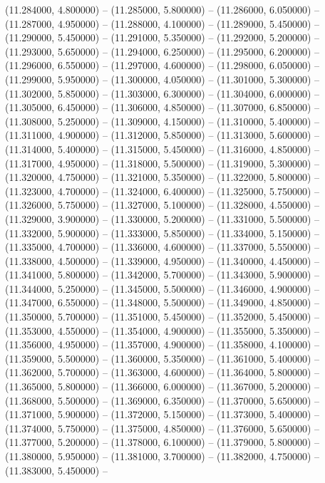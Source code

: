 (11.284000, 4.800000) -- 
(11.285000, 5.800000) -- 
(11.286000, 6.050000) -- 
(11.287000, 4.950000) -- 
(11.288000, 4.100000) -- 
(11.289000, 5.450000) -- 
(11.290000, 5.450000) -- 
(11.291000, 5.350000) -- 
(11.292000, 5.200000) -- 
(11.293000, 5.650000) -- 
(11.294000, 6.250000) -- 
(11.295000, 6.200000) -- 
(11.296000, 6.550000) -- 
(11.297000, 4.600000) -- 
(11.298000, 6.050000) -- 
(11.299000, 5.950000) -- 
(11.300000, 4.050000) -- 
(11.301000, 5.300000) -- 
(11.302000, 5.850000) -- 
(11.303000, 6.300000) -- 
(11.304000, 6.000000) -- 
(11.305000, 6.450000) -- 
(11.306000, 4.850000) -- 
(11.307000, 6.850000) -- 
(11.308000, 5.250000) -- 
(11.309000, 4.150000) -- 
(11.310000, 5.400000) -- 
(11.311000, 4.900000) -- 
(11.312000, 5.850000) -- 
(11.313000, 5.600000) -- 
(11.314000, 5.400000) -- 
(11.315000, 5.450000) -- 
(11.316000, 4.850000) -- 
(11.317000, 4.950000) -- 
(11.318000, 5.500000) -- 
(11.319000, 5.300000) -- 
(11.320000, 4.750000) -- 
(11.321000, 5.350000) -- 
(11.322000, 5.800000) -- 
(11.323000, 4.700000) -- 
(11.324000, 6.400000) -- 
(11.325000, 5.750000) -- 
(11.326000, 5.750000) -- 
(11.327000, 5.100000) -- 
(11.328000, 4.550000) -- 
(11.329000, 3.900000) -- 
(11.330000, 5.200000) -- 
(11.331000, 5.500000) -- 
(11.332000, 5.900000) -- 
(11.333000, 5.850000) -- 
(11.334000, 5.150000) -- 
(11.335000, 4.700000) -- 
(11.336000, 4.600000) -- 
(11.337000, 5.550000) -- 
(11.338000, 4.500000) -- 
(11.339000, 4.950000) -- 
(11.340000, 4.450000) -- 
(11.341000, 5.800000) -- 
(11.342000, 5.700000) -- 
(11.343000, 5.900000) -- 
(11.344000, 5.250000) -- 
(11.345000, 5.500000) -- 
(11.346000, 4.900000) -- 
(11.347000, 6.550000) -- 
(11.348000, 5.500000) -- 
(11.349000, 4.850000) -- 
(11.350000, 5.700000) -- 
(11.351000, 5.450000) -- 
(11.352000, 5.450000) -- 
(11.353000, 4.550000) -- 
(11.354000, 4.900000) -- 
(11.355000, 5.350000) -- 
(11.356000, 4.950000) -- 
(11.357000, 4.900000) -- 
(11.358000, 4.100000) -- 
(11.359000, 5.500000) -- 
(11.360000, 5.350000) -- 
(11.361000, 5.400000) -- 
(11.362000, 5.700000) -- 
(11.363000, 4.600000) -- 
(11.364000, 5.800000) -- 
(11.365000, 5.800000) -- 
(11.366000, 6.000000) -- 
(11.367000, 5.200000) -- 
(11.368000, 5.500000) -- 
(11.369000, 6.350000) -- 
(11.370000, 5.650000) -- 
(11.371000, 5.900000) -- 
(11.372000, 5.150000) -- 
(11.373000, 5.400000) -- 
(11.374000, 5.750000) -- 
(11.375000, 4.850000) -- 
(11.376000, 5.650000) -- 
(11.377000, 5.200000) -- 
(11.378000, 6.100000) -- 
(11.379000, 5.800000) -- 
(11.380000, 5.950000) -- 
(11.381000, 3.700000) -- 
(11.382000, 4.750000) -- 
(11.383000, 5.450000) -- 
